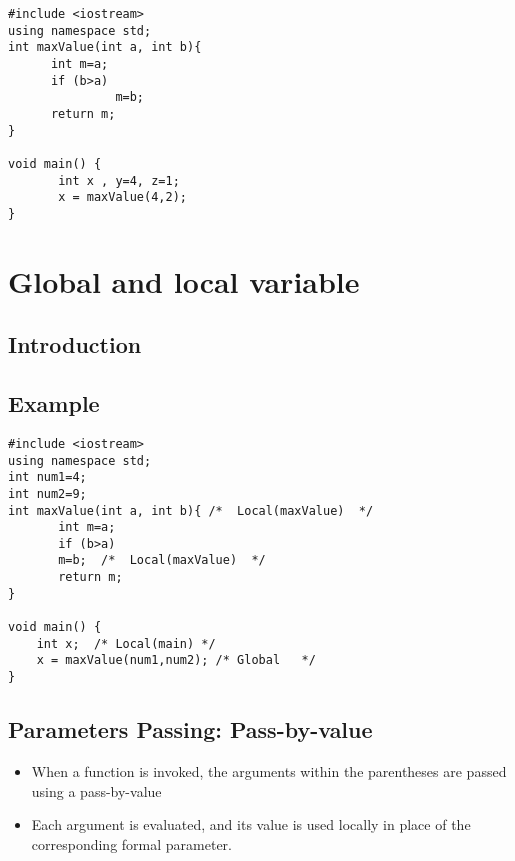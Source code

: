 \documentclass[a4paper]{article}
\begin{document}
\begin{eg}

\end{eg}

\begin{lstlisting}
#include <iostream> 
using namespace std;
int maxValue(int a, int b){
      int m=a;
      if (b>a)
               m=b;
      return m;
}
 
void main() {
       int x , y=4, z=1;
       x = maxValue(4,2);
}
\end{lstlisting}

\section{Global and local variable}
\subsection{Introduction}

\subsection{Example}
\begin{eg}

\end{eg}

\begin{lstlisting}
#include <iostream> 
using namespace std; 
int num1=4;
int num2=9;
int maxValue(int a, int b){ /*  Local(maxValue)  */
       int m=a;
       if (b>a) 
       m=b;  /*  Local(maxValue)  */
       return m; 
}

void main() {
    int x;  /* Local(main) */
    x = maxValue(num1,num2); /* Global   */
}

\end{lstlisting}

\subsection{Parameters Passing: Pass-by-value}
\begin{itemize}
\item When a function is invoked, the arguments within the parentheses are passed using a pass-by-value
\item Each argument is evaluated, and its value is used locally in place of the corresponding formal parameter.
\end{itemize}

\begin{eg}

\end{eg}
\end{document}

